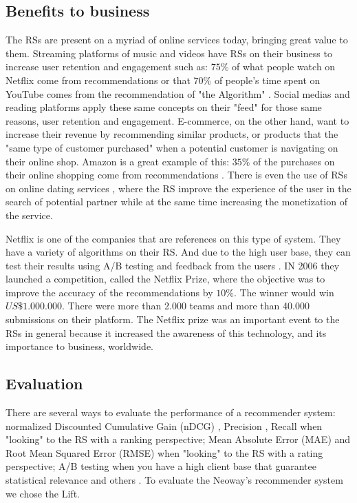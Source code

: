 \subsection{Benefits to business}

The RSs are present on a myriad of online services today, bringing great value to them. Streaming platforms of music and videos have RSs on their business to increase user retention and engagement such as: $75\%$ of what people watch on Netflix come from recommendations \cite{HowretailerscankeepupwithconsumersMcKinsey} or that $70\%$ of people's time spent on YouTube comes from the recommendation of "the Algorithm" \cite{CES2018YouTubesAIrecommendationsdrive70percentofviewingCNET}. Social medias and reading platforms apply these same concepts on their "feed" for those same reasons, user retention and engagement. E-commerce, on the other hand, want to increase their revenue by recommending similar products, or products that the "same type of customer purchased" when a potential customer is navigating on their online shop. Amazon is a great example of this: $35\%$ of the purchases on their online shopping come from recommendations \cite{HowretailerscankeepupwithconsumersMcKinsey}. There is even the use of RSs on online dating services \cite{brozovsky2007recommender}, where the RS improve the experience of the user in the search of potential partner while at the same time increasing the monetization of the service.

Netflix is one of the companies that are references on this type of system. They have a variety of algorithms on their RS. And due to the high user base, they can test their results using A/B testing and feedback from the users \cite{gomez2016netflix}. IN 2006 they launched a competition, called the Netflix Prize, where the objective was to improve the accuracy of the recommendations by $10\%$. The winner would win $US\$ 1.000.000$. There were more than 2.000 teams and more than 40.000 submissions on their platform. The Netflix prize was an important event to the RSs in general because it increased the awareness of this technology, and its importance to business, worldwide. 

\subsection{Evaluation}
\label{ch:evaluation}

There are several ways to evaluate the performance of a recommender system: normalized Discounted Cumulative Gain (nDCG) \cite{jarvelin2002cumulated}, Precision \cite{Precision-rs-metric}, Recall \cite{cremonesi2010performance} when "looking" to the RS with a ranking perspective; Mean Absolute Error (MAE) \cite{breese1998empirical} and Root Mean Squared Error (RMSE) \cite{bennett2007netflix} when "looking" to the RS with a rating perspective; A/B testing when you have a high client base that guarantee statistical relevance and others \cite{parra2013recommender}. To evaluate the Neoway's recommender system we chose the Lift.

